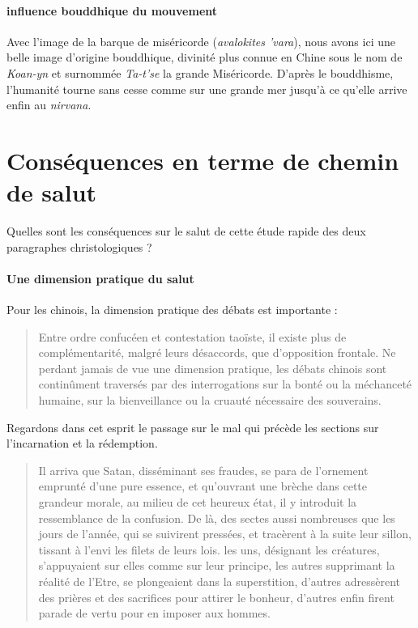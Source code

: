   \paragraph{influence bouddhique du mouvement} Avec l'image de la barque de miséricorde (\emph{avalokites 'vara}), nous avons ici une belle image d'origine bouddhique, divinité plus connue en Chine sous le nom de \emph{Koan-yn} et surnommée \emph{Ta-t'se} la grande Miséricorde. D'après le bouddhisme, l'humanité tourne sans cesse comme sur une grande mer jusqu'à ce qu'elle arrive enfin au \textit{nirvana}. 
  
\section{Conséquences en terme de chemin de salut}

Quelles sont les conséquences sur le salut de cette étude rapide des deux paragraphes christologiques ?

\paragraph{Une dimension pratique du salut} Pour les chinois, la dimension pratique des débats est importante : 

\begin{quote}
    Entre ordre confucéen et contestation taoïste, il existe plus de complémentarité, malgré leurs désaccords, que d’opposition frontale. Ne perdant jamais de vue une dimension pratique, les débats chinois sont continûment traversés par des interrogations sur la bonté ou la méchanceté humaine, sur la bienveillance ou la cruauté nécessaire des souverains.

\cite[p. 147]{PolDroit:voyage}  
\end{quote}
 Regardons dans cet esprit le passage sur le mal qui précède les sections sur l'incarnation et la rédemption.
\begin{quote}
   Il arriva que Satan, disséminant ses fraudes, se para de l'ornement emprunté d'une pure essence, et qu'ouvrant une brèche dans cette grandeur morale, au milieu de cet heureux état, il y introduit la ressemblance de la confusion.
De là, des sectes aussi nombreuses que les jours de l'année, qui se suivirent pressées, et tracèrent à la suite leur sillon, tissant à l'envi les filets de leurs lois. les uns, désignant les créatures, s'appuyaient sur elles comme sur leur principe, les autres supprimant la réalité de l'Etre, se plongeaient dans la superstition, d'autres adressèrent des prières et des sacrifices pour attirer le bonheur, d'autres enfin firent parade de vertu pour en imposer aux hommes. 
\end{quote}
 
